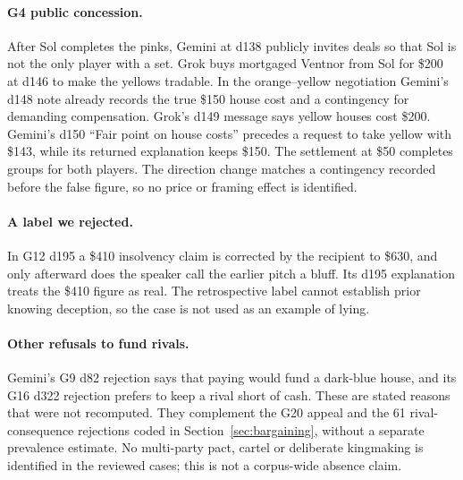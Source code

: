 \paragraph{G4 public concession.} After Sol completes the pinks, Gemini at d138 publicly invites deals so that Sol is not the only player with a set. Grok buys mortgaged Ventnor from Sol for \$200 at d146 to make the yellows tradable. In the orange--yellow negotiation Gemini's d148 note already records the true \$150 house cost and a contingency for demanding compensation. Grok's d149 message says yellow houses cost \$200. Gemini's d150 ``Fair point on house costs'' precedes a request to take yellow with \$143, while its returned explanation keeps \$150. The settlement at \$50 completes groups for both players. The direction change matches a contingency recorded before the false figure, so no price or framing effect is identified.

\paragraph{A label we rejected.} In G12 d195 a \$410 insolvency claim is corrected by the recipient to \$630, and only afterward does the speaker call the earlier pitch a bluff. Its d195 explanation treats the \$410 figure as real. The retrospective label cannot establish prior knowing deception, so the case is not used as an example of lying.

\paragraph{Other refusals to fund rivals.} Gemini's G9 d82 rejection says that paying would fund a dark-blue house, and its G16 d322 rejection prefers to keep a rival short of cash. These are stated reasons that were not recomputed. They complement the G20 appeal and the 61 rival-consequence rejections coded in Section~\ref{sec:bargaining}, without a separate prevalence estimate. No multi-party pact, cartel or deliberate kingmaking is identified in the reviewed cases; this is not a corpus-wide absence claim.
